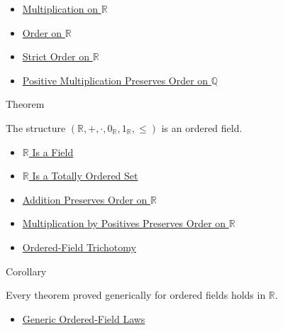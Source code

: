 \begin{dependencies}
\begin{itemize}
  \item \hyperref[def:multiplication-on-r]{Multiplication on $\mathbb{R}$}
  \item \hyperref[def:order-on-r]{Order on $\mathbb{R}$}
  \item \hyperref[def:strict-order-on-r]{Strict Order on $\mathbb{R}$}
  \item \hyperref[thm:positive-multiplication-preserves-order-on-q]{Positive Multiplication Preserves Order on $\mathbb{Q}$}
\end{itemize}
\end{dependencies}

\begin{theorembox}{Theorem}
\begin{theorem}
\label{thm:r-is-an-ordered-field}
The structure $(\mathbb{R},+,\cdot,0_{\mathbb{R}},1_{\mathbb{R}},\le)$ is an
ordered field.
\end{theorem}
\end{theorembox}

\begin{dependencies}
\begin{itemize}
  \item \hyperref[thm:r-is-a-field]{$\mathbb{R}$ Is a Field}
  \item \hyperref[thm:r-totally-ordered-set]{$\mathbb{R}$ Is a Totally Ordered Set}
  \item \hyperref[thm:addition-preserves-order-on-r]{Addition Preserves Order on $\mathbb{R}$}
  \item \hyperref[thm:positive-multiplication-preserves-order-on-r]{Multiplication by Positives Preserves Order on $\mathbb{R}$}
  \item \hyperref[ax:ordered-field-trichotomy]{Ordered-Field Trichotomy}
\end{itemize}
\end{dependencies}

\begin{corollarybox}{Corollary}
\begin{corollary}
\label{cor:ordered-field-laws-on-r}
Every theorem proved generically for ordered fields holds in $\mathbb{R}$.
\end{corollary}
\end{corollarybox}

\begin{dependencies}
\begin{itemize}
  \item \hyperref[cor:generic-ordered-field-laws]{Generic Ordered-Field Laws}
\end{itemize}
\end{dependencies}

